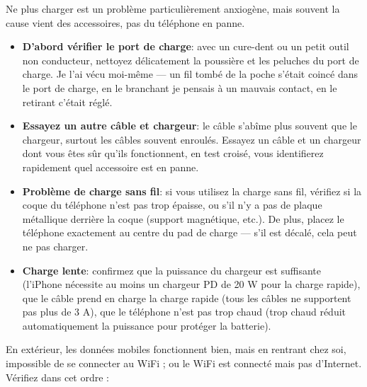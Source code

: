 Ne plus charger est un problème particulièrement anxiogène, mais souvent la cause vient des accessoires, pas du téléphone en panne.

\begin{itemize}
  \item \textbf{D'abord vérifier le port de charge}: avec un cure-dent ou un petit outil non conducteur, nettoyez délicatement la poussière et les peluches du port de charge. Je l'ai vécu moi-même — un fil tombé de la poche s'était coincé dans le port de charge, en le branchant je pensais à un mauvais contact, en le retirant c'était réglé.
  \item \textbf{Essayez un autre câble et chargeur}: le câble s'abîme plus souvent que le chargeur, surtout les câbles souvent enroulés. Essayez un câble et un chargeur dont vous êtes sûr qu'ils fonctionnent, en test croisé, vous identifierez rapidement quel accessoire est en panne.
  \item \textbf{Problème de charge sans fil}: si vous utilisez la charge sans fil, vérifiez si la coque du téléphone n'est pas trop épaisse, ou s'il n'y a pas de plaque métallique derrière la coque (support magnétique, etc.). De plus, placez le téléphone exactement au centre du pad de charge — s'il est décalé, cela peut ne pas charger.
  \item \textbf{Charge lente}: confirmez que la puissance du chargeur est suffisante (l'iPhone nécessite au moins un chargeur PD de 20 W pour la charge rapide), que le câble prend en charge la charge rapide (tous les câbles ne supportent pas plus de 3 A), que le téléphone n'est pas trop chaud (trop chaud réduit automatiquement la puissance pour protéger la batterie).
\end{itemize}


En extérieur, les données mobiles fonctionnent bien, mais en rentrant chez soi, impossible de se connecter au WiFi ; ou le WiFi est connecté mais pas d'Internet. Vérifiez dans cet ordre :

